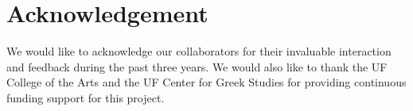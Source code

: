 \documentclass[amsthm,ebook]{saparticle}
\begin{document}
\section*{Acknowledgement}

We would like to acknowledge our collaborators for their invaluable interaction and feedback during the past three
years. We would also like to thank the UF College of the Arts and the UF Center for Greek Studies for providing
continuous funding support for this project. 



\end{document}
